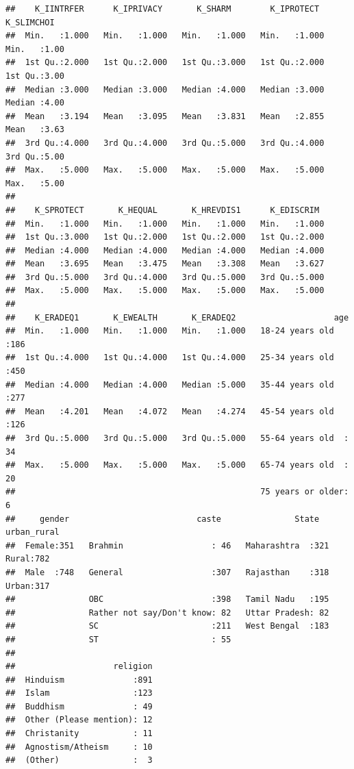 \documentclass[
]{article}
\begin{document}
\begin{verbatim}
##    K_IINTRFER      K_IPRIVACY       K_SHARM        K_IPROTECT      K_SLIMCHOI  
##  Min.   :1.000   Min.   :1.000   Min.   :1.000   Min.   :1.000   Min.   :1.00  
##  1st Qu.:2.000   1st Qu.:2.000   1st Qu.:3.000   1st Qu.:2.000   1st Qu.:3.00  
##  Median :3.000   Median :3.000   Median :4.000   Median :3.000   Median :4.00  
##  Mean   :3.194   Mean   :3.095   Mean   :3.831   Mean   :2.855   Mean   :3.63  
##  3rd Qu.:4.000   3rd Qu.:4.000   3rd Qu.:5.000   3rd Qu.:4.000   3rd Qu.:5.00  
##  Max.   :5.000   Max.   :5.000   Max.   :5.000   Max.   :5.000   Max.   :5.00  
##                                                                                
##    K_SPROTECT       K_HEQUAL       K_HREVDIS1      K_EDISCRIM   
##  Min.   :1.000   Min.   :1.000   Min.   :1.000   Min.   :1.000  
##  1st Qu.:3.000   1st Qu.:2.000   1st Qu.:2.000   1st Qu.:2.000  
##  Median :4.000   Median :4.000   Median :4.000   Median :4.000  
##  Mean   :3.695   Mean   :3.475   Mean   :3.308   Mean   :3.627  
##  3rd Qu.:5.000   3rd Qu.:4.000   3rd Qu.:5.000   3rd Qu.:5.000  
##  Max.   :5.000   Max.   :5.000   Max.   :5.000   Max.   :5.000  
##                                                                 
##    K_ERADEQ1       K_EWEALTH       K_ERADEQ2                    age     
##  Min.   :1.000   Min.   :1.000   Min.   :1.000   18-24 years old  :186  
##  1st Qu.:4.000   1st Qu.:4.000   1st Qu.:4.000   25-34 years old  :450  
##  Median :4.000   Median :4.000   Median :5.000   35-44 years old  :277  
##  Mean   :4.201   Mean   :4.072   Mean   :4.274   45-54 years old  :126  
##  3rd Qu.:5.000   3rd Qu.:5.000   3rd Qu.:5.000   55-64 years old  : 34  
##  Max.   :5.000   Max.   :5.000   Max.   :5.000   65-74 years old  : 20  
##                                                  75 years or older:  6  
##     gender                          caste               State     urban_rural
##  Female:351   Brahmin                  : 46   Maharashtra  :321   Rural:782  
##  Male  :748   General                  :307   Rajasthan    :318   Urban:317  
##               OBC                      :398   Tamil Nadu   :195              
##               Rather not say/Don't know: 82   Uttar Pradesh: 82              
##               SC                       :211   West Bengal  :183              
##               ST                       : 55                                  
##                                                                              
##                    religion  
##  Hinduism              :891  
##  Islam                 :123  
##  Buddhism              : 49  
##  Other (Please mention): 12  
##  Christanity           : 11  
##  Agnostism/Atheism     : 10  
##  (Other)               :  3
\end{verbatim}
\end{document}
